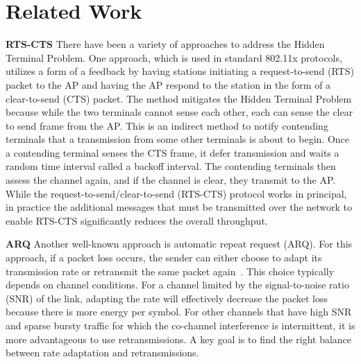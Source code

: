 \section{Related Work}
\label{s:related}

\textbf{RTS-CTS} There have been a variety of approaches to address the Hidden Terminal Problem. One approach, which is used in 
standard 802.11x protocols, utilizes a form of a feedback by having stations initiating a request-to-send (RTS) packet to the AP and having the AP respond to the station in the form of a clear-to-send (CTS) packet. The method 
mitigates the Hidden Terminal Problem because while the two terminals cannot sense each other, each can sense the clear to send frame from the AP. This is an indirect method to notify contending terminals that a transmission from some other terminals is about to begin. Once a contending terminal senses the CTS frame, it defer transmission and waits a random time interval called a backoff interval. The contending terminals then assess the channel again, and if the channel is clear, they transmit to the AP.  While the request-to-send/clear-to-send (RTS-CTS) protocol works in principal, in practice the additional messages that must be transmitted over the network to enable RTS-CTS significantly reduces the overall throughput.
	
\textbf{ARQ} Another well-known approach is automatic repeat request (ARQ). For this approach, if a packet loss occurs, the sender can either choose to adapt its transmission rate or retransmit the same packet again~\cite{80211_spec}. This choice typically depends on channel conditions. For a channel limited by the signal-to-noise ratio (SNR) of the link, adapting the rate will effectively decrease the packet loss because there is more energy per symbol. For other channels that have high SNR and sparse bursty traffic for which the co-channel interference is intermittent, it is more advantageous to use retransmissions. A key goal is to find the right balance between rate adaptation and retransmissions. 


